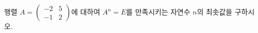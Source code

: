 \hspace*{2mm}\begin{minipage}[t]{\dimexpr\linewidth-2mm\relax}\vspace{0pt}
행렬 $A=\begin{pmatrix} -2 & 5 \\ -1 & 2 \end{pmatrix}$에 대하여 $A^n=E$를 만족시키는 자연수 $n$의 최솟값을 구하시오.\end{minipage}
